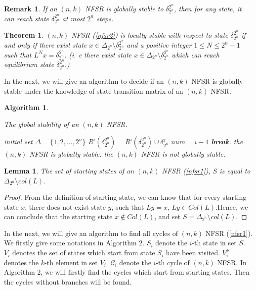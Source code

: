 \documentclass[conference]{IEEEtran}
\newtheorem{theorem}{Theorem}
\newtheorem{lemma}{Lemma}
\newtheorem{remark}{Remark}
\newtheorem{algorithm}{Algorithm}
\begin{document}
\begin{remark}
If an $(n,k)$ NFSR is globally stable to $\delta^{2^n}_{2^n}$, then for any state, it can reach state $\delta^{2^n}_{2^n}$ at most $2^n$ steps.
\end{remark}

\begin{theorem}
$(n,k)$ NFSR (\ref{nfsr2}) is locally stable with respect to state $\delta^{2^n}_{2^n}$ if and only if there exist state $x\in \Delta_{2^n} \setminus \delta^{2^n}_{2^n}$ and a positive integer $1\leq N\leq 2^n-1$ such that $L^Nx=\delta^{2^n}_{2^n}$. (i. e there exist state $x\in \Delta_{2^n} \setminus \delta^{2^n}_{2^n}$ which can reach equilibrium state $\delta^{2^n}_{2^n}$.)
\end{theorem}


In the next, we will give an algorithm to decide if an $(n,k)$ NFSR is globally stable under the knowledge of state transition matrix of an $(n,k)$ NFSR.
\begin{algorithm}\label{algorithm1}
\caption{The global stability of an $(n,k)$ NFSR.}
\begin{algorithmic}[1]
\STATE initial set $\Delta=\{1,2,...,2^n\}$
\STATE $R^i(\delta^{2^n}_{2^n})=R^i(\delta^{2^n}_{2^n})\cup \delta^j_{2^n}$
\ENDIF
\ENDFOR
{}
\STATE $num=i-1$
\STATE \textbf{break}.
\ENDIF
\ENDFOR
{}
\STATE the $(n,k)$ NFSR is globally stable.
\ELSE
\STATE the $(n,k)$ NFSR is not globally stable.
\ENDIF
\end{algorithmic}
\end{algorithm}


\begin{lemma}
The set of starting states of an $(n,k)$ NFSR (\ref{nfsr1}), $S$ is equal to $\Delta_{2^n}\setminus col(L)$.
\end{lemma}
\begin{proof}
From the definition of starting state, we can know that for every starting state $x$, there does not exist state $y$, such that $Ly=x$, $Ly\in Col(L)$.Hence, we can conclude that the starting state $x\notin Col(L)$, and set $S=\Delta_{2^n}\setminus col(L)$.
\end{proof}

In the next, we will give an algorithm to find all cycles of $(n,k)$ NFSR (\ref{nfsr1}).
We firstly give some notations in Algorithm 2. $S_i$ denote the $i$-th state in set $S$.
$V_i$ denotes the set of states which start from state $S_i$ have been visited. $V^k_i$ denotes the $k$-th element in set $V_i$.
$\mathcal{C}_i$ denote the $i$-th cycle of $(n,k)$ NFSR.
 In Algorithm 2, we will firstly find the cycles which start from starting states. Then the cycles without branches will be found.
\end{document}
